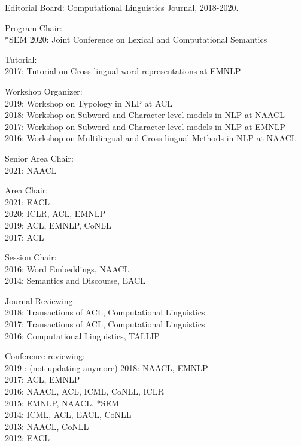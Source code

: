 \documentclass[margin,line]{res}
\begin{document}
\begin{resume}
\begin{hangparas}{.25in}{1}
Editorial Board: Computational Linguistics Journal, 2018-2020.

Program Chair:\\
*SEM 2020: Joint Conference on Lexical and Computational Semantics

Tutorial:\\
2017: Tutorial on Cross-lingual word representations at EMNLP

Workshop Organizer:\\
2019: Workshop on Typology in NLP at ACL\\
2018: Workshop on Subword and Character-level models in NLP at NAACL\\
2017: Workshop on Subword and Character-level models in NLP at EMNLP\\
2016: Workshop on Multilingual and Cross-lingual Methods in NLP at NAACL

Senior Area Chair:\\
2021: NAACL

Area Chair:\\
2021: EACL\\
2020: ICLR, ACL, EMNLP\\
2019: ACL, EMNLP, CoNLL\\
2017: ACL

Session Chair:\\
2016: Word Embeddings, NAACL\\
2014: Semantics and Discourse, EACL

Journal Reviewing: \\
2018: Transactions of ACL, Computational Linguistics\\
2017: Transactions of ACL, Computational Linguistics\\
2016: Computational Linguistics, TALLIP

Conference reviewing: \\
2019-: (not updating anymore)
2018: NAACL, EMNLP\\
2017: ACL, EMNLP\\
2016: NAACL, ACL, ICML, CoNLL, ICLR\\
2015: EMNLP, NAACL, *SEM\\
2014: ICML, ACL, EACL, CoNLL \\
2013: NAACL, CoNLL \\
2012: EACL

\end{hangparas}


\end{resume}
\end{document}
